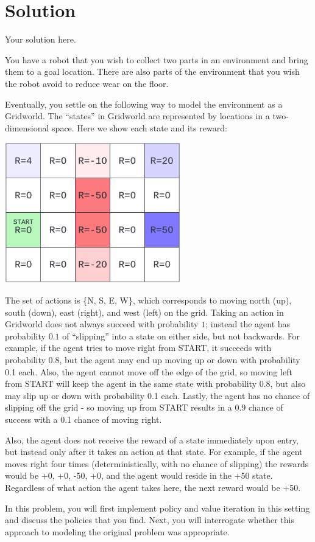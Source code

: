 \documentclass[submit]{harvardml}
\newenvironment{solution}
  {\color{blue}\section*{Solution}}
{}
\begin{document}
\begin{solution}
	Your solution here.
\end{solution}

\newpage

\begin{problem}

You have a robot that you wish to collect two parts in an environment
and bring them to a goal location.  There are also parts of the
environment that you wish the robot avoid to reduce wear on the floor.

Eventually, you settle on the following way to model the environment
as a Gridworld.  The ``states'' in Gridworld are represented by
locations in a two-dimensional space.  Here we show each state and its
reward:

\begin{center}
\includegraphics[width=3in]{images/gridworld.png}
\end{center}

The set of actions is \{N, S, E, W\}, which corresponds to moving north (up), south (down), east (right), and west (left) on the grid. Taking an action in Gridworld does not always succeed with probability
$1$; instead the agent has probability $0.1$ of ``slipping'' into a
state on either side, but not backwards.  For example, if the agent tries to move right from START, it succeeds with probability 0.8, but the agent may end up moving up or down with probability 0.1 each. Also, the agent cannot move off the edge of the grid, so moving left from START will keep the agent in the same state with probability 0.8, but also may slip up or down with probability 0.1 each. Lastly, the agent has no chance of slipping off the grid - so moving up from START results in a 0.9 chance of success with a 0.1 chance of moving right.

Also, the agent does not receive the reward of a state immediately upon entry, but instead only after it takes an action at that state. For example, if the agent moves right four times (deterministically, with no chance of slipping) the rewards would be +0, +0, -50, +0, and the agent would reside in the +50 state. Regardless of what action the agent takes here, the next reward would be +50.

In this problem, you will first implement policy and value iteration in this setting and discuss the policies that you find.  Next, you will interrogate whether this approach to modeling the original problem was appropriate.

\end{problem}
\newpage
\end{document}
